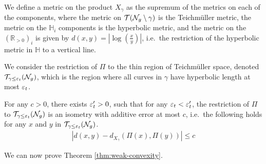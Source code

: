 We define a metric on the product $X_\gamma$ as the supremum of the metrics on each of the components, where the metric on $\mathcal{T}(\mathcal{N}_g \setminus \gamma)$ is the Teichmüller metric, the metric on the $\mathbb{H}_i$ components is the hyperbolic metric, and the metric on the $(\mathbb{R}_{>0})_i$ is given by $d(x,y) = \left| \log\left( \frac{x}{y}  \right) \right| $, i.e.\ the restriction of the hyperbolic metric in $\mathbb{H}$ to a vertical line.

We consider the restriction of $\Pi$ to the thin region of Teichmüller space, denoted $\mathcal{T}_{\gamma \leq \varepsilon_t}(\mathcal{N}_g)$, which is the region where all curves in $\gamma$ have hyperbolic length at most $\varepsilon_t$.

\begingroup
\def\thetheorem{\ref{thm:prno}}
\begin{theorem}
  For any $c >0$, there exists  $\varepsilon_t^{\prime} > 0$, such that for any $\varepsilon_t < \varepsilon_t^{\prime}$, the restriction of $\Pi$ to $\mathcal{T}_{\gamma \leq \varepsilon_t}(\mathcal{N}_g)$ is an isometry with additive error at most $c$, i.e.\ the following holds for any $x$ and $y$ in $\mathcal{T}_{\gamma \leq \varepsilon_t}(\mathcal{N}_g)$.
  \begin{align*}
    \left| d(x, y) - d_{X_{\gamma}}(\Pi(x), \Pi(y)) \right| \leq c
  \end{align*}

\end{theorem}
\addtocounter{theorem}{-1}
\endgroup

We can now prove Theorem \ref{thm:weak-convexity}.

